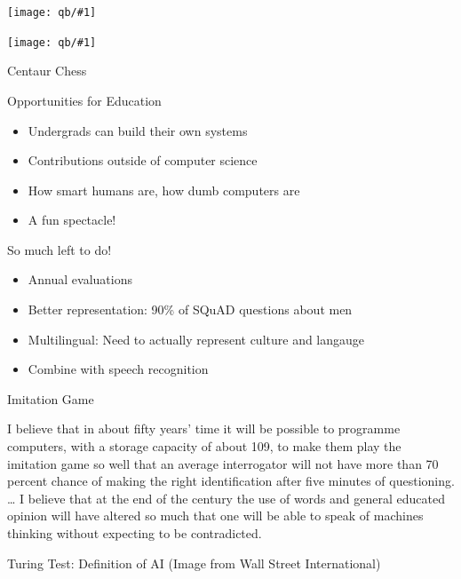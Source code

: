 \documentclass[xcolor=dvipsnames,xcolor=table]{beamer}
\newcommand{\fsi}[2]{
\begin{frame}[plain]
\vspace*{-1pt}
\makebox[\linewidth]{\texttt{[image: \#1]}}
\begin{center}
#2
\end{center}
\end{frame}
}
\newcommand{\gfxq}[2]{
\begin{center}
	\texttt{[image: qb/\#1]}
\end{center}
}
\begin{document}
\begin{frame}[plain]
\gfxq{seattle_crowd}{.5}
\gfxq{chicago_crowd}{.5}
\end{frame}

\fsi{qb/boring_dot_products}{}

\fsi{simtrans/centaur-chess}{Centaur Chess}

\begin{frame}{Opportunities for Education}

  \begin{itemize}
  \item Undergrads can build their own systems
  \item Contributions outside of computer science
  \item How smart humans are, how dumb computers are
  \item A fun spectacle!
  \end{itemize}

\end{frame}

\begin{frame}{So much left to do!}

  \begin{itemize}
  \item Annual evaluations
  \item Better representation: 90\% of SQuAD questions about men
  \item Multilingual: Need to actually represent culture and langauge
  \item Combine with speech recognition
  \end{itemize}
  
\end{frame}

\begin{frame}{Imitation Game}

  I believe that in about fifty years’ time it will be possible to programme computers, with a storage capacity of about 109, to make them play the imitation game so well that an average interrogator will not have more than 70 percent chance of making the right identification after five minutes of questioning. … I believe that at the end of the century the use of words and general educated opinion will have altered so much that one will be able to speak of machines thinking without expecting to be contradicted.

\end{frame}

\fsi{qb/turing}{Turing Test: Definition of AI (Image from Wall Street
  International)}
\end{document}
